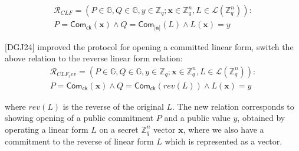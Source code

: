 \documentclass[11pt,a4]{article}
\newcommand{\Com}{\mathsf{Com}}
\newcommand{\ZZ}        {\mathbb{Z}}
\newcommand{\RRR}{\mathcal{R}}
\newcommand{\LLL}{\mathcal{L}}
\newcommand{\group}{\mathbb{G}}
\begin{document}
\begin{align*}
    \RRR_{CLF}=(P\in\group,Q\in\group,y\in\ZZ_q;\textbf{x}\in\ZZ_q^n,L\in\LLL(\ZZ_q^n)):\\
    P=\Com_{\mathsf{ck}}(\textbf{x})\land Q=\Com_{\textbf{[a]}}(L) \land L(\textbf{x})=y
\end{align*}




[DGJ24] improved the protocol for opening a committed linear form, switch the above relation to the reverse linear form relation:
\begin{align*}
    \RRR_{CLF_rev}=(P\in\group,Q\in\group,y\in\ZZ_q;\textbf{x}\in\ZZ_q^n,L\in\LLL(\ZZ_q^n)):\\
    P=\Com_{\mathsf{ck}}(\textbf{x}) \land Q=\Com_{\mathsf{ck}}(rev(L)) \land L(\textbf{x})=y
\end{align*}

where $rev(L)$ is the reverse of the original $L$. The new relation corresponds to showing opening of a public commitment $P$ and a public value $y$, obtained by operating a linear form $L$ on a secret $\ZZ_q^n$ vector $\textbf{x}$, where we also have a commitment to the reverse of linear form $L$ which is represented as a vector.
\end{document}
